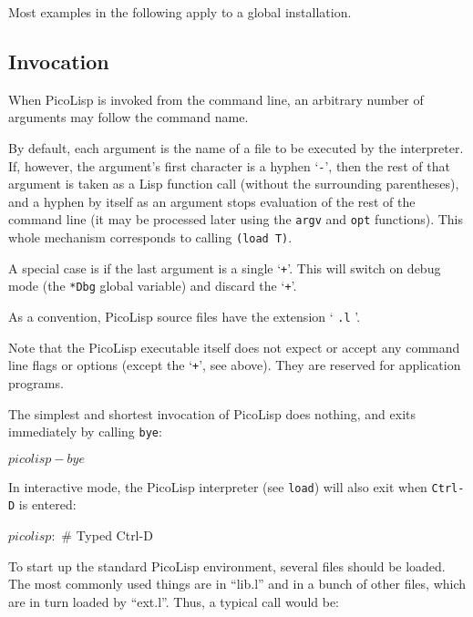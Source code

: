 Most examples in the following apply to a global installation.

 

 
\subsection{Invocation}
\label{sec:refm-invocation}


When PicoLisp is invoked from the command line, an arbitrary number of
arguments may follow the command name.

By default, each argument is the name of a file to be executed by the
interpreter. If, however, the argument's first character is a hyphen
`\texttt{-}', then the rest of that argument is taken as a Lisp function call
(without the surrounding parentheses), and a hyphen by itself as an
argument stops evaluation of the rest of the command line (it may be
processed later using the \texttt{argv} and \texttt{opt} functions). This whole
mechanism corresponds to calling \texttt{(load T)}.

A special case is if the last argument is a single `\texttt{+}'. This will
switch on debug mode (the \texttt{*Dbg} global variable) and discard the `\texttt{+}'.

As a convention, PicoLisp source files have the extension ` \texttt{.l} '.

Note that the PicoLisp executable itself does not expect or accept any
command line flags or options (except the `\texttt{+}', see above). They are
reserved for application programs.

The simplest and shortest invocation of PicoLisp does nothing, and exits
immediately by calling \texttt{bye}:


\begin{wideverbatim}
$ picolisp -bye
$
\end{wideverbatim}

In interactive mode, the PicoLisp interpreter (see \texttt{load}) will also
exit when \texttt{Ctrl-D} is entered:


\begin{wideverbatim}
$ picolisp
: $                     # Typed Ctrl-D
\end{wideverbatim}

To start up the standard PicoLisp environment, several files should be
loaded. The most commonly used things are in ``lib.l'' and in a bunch of
other files, which are in turn loaded by ``ext.l''. Thus, a typical call
would be:



